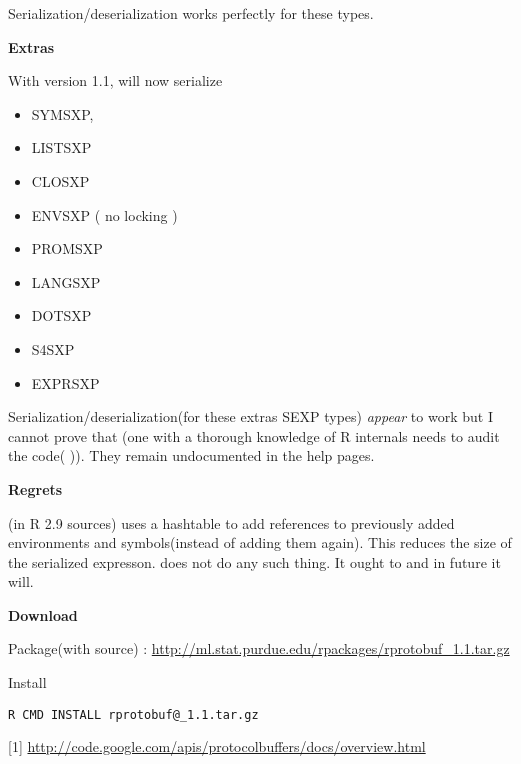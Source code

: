 \documentclass[letterpaper,10pt,english]{sphinxmanual}
\begin{document}
Serialization/deserialization works perfectly for these types.

\textbf{Extras}

With version 1.1,  will now serialize
\begin{itemize}
\item {} 
SYMSXP,

\item {} 
LISTSXP

\item {} 
CLOSXP

\item {} 
ENVSXP ( no locking )

\item {} 
PROMSXP

\item {} 
LANGSXP

\item {} 
DOTSXP

\item {} 
S4SXP

\item {} 
EXPRSXP

\end{itemize}

Serialization/deserialization(for these extras SEXP types)  \emph{appear} to work but I cannot prove that (one with a thorough knowledge of R internals needs to audit the code(  )). They remain undocumented in the help pages.

\textbf{Regrets}

 (in R 2.9 sources) uses a hashtable to add references to previously added environments and symbols(instead of adding them again). This reduces the size of the serialized expresson.  does not do any such thing. It ought to and in future it will.

\textbf{Download}

Package(with source) : \href{http://ml.stat.purdue.edu/rpackages/rprotobuf\_1.1.tar.gz}{http://ml.stat.purdue.edu/rpackages/rprotobuf\_1.1.tar.gz}

Install

\begin{Verbatim}[commandchars=@\[\]]
R CMD INSTALL rprotobuf@_1.1.tar.gz
\end{Verbatim}

{[}1{]} \href{http://code.google.com/apis/protocolbuffers/docs/overview.html}{http://code.google.com/apis/protocolbuffers/docs/overview.html}
\end{document}
